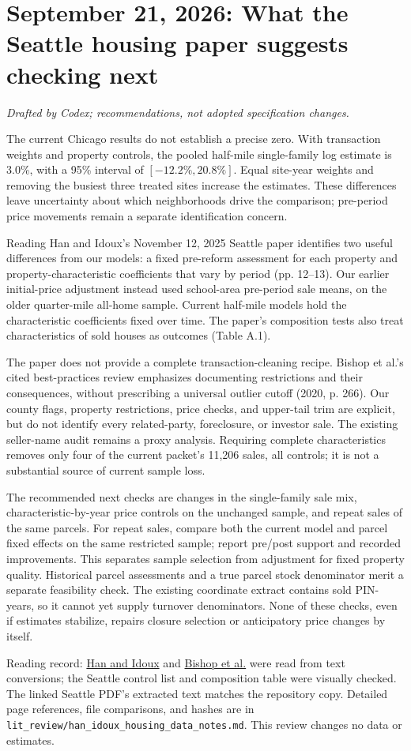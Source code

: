 \section*{September 21, 2026: What the Seattle housing paper suggests checking next}
\textit{Drafted by Codex; recommendations, not adopted specification changes.}

The current Chicago results do not establish a precise zero. With transaction
weights and property controls, the pooled half-mile single-family log estimate
is 3.0\%, with a 95\% interval of $[-12.2\%,20.8\%]$. Equal site-year weights
and removing the busiest three treated sites increase the estimates. These
differences leave uncertainty about which neighborhoods drive the comparison;
pre-period price movements remain a separate identification concern.

Reading Han and Idoux's November 12, 2025 Seattle paper identifies two useful
differences from our models: a fixed pre-reform assessment for each property
and property-characteristic coefficients that vary by period (pp. 12--13).
Our earlier initial-price adjustment instead used school-area pre-period sale
means, on the older quarter-mile all-home sample. Current half-mile models
hold the characteristic coefficients fixed over time. The paper's composition
tests also treat characteristics of sold houses as outcomes (Table A.1).

The paper does not provide a complete transaction-cleaning recipe. Bishop et
al.'s cited best-practices review emphasizes documenting restrictions and their
consequences, without prescribing a universal outlier cutoff (2020, p. 266).
Our county flags, property restrictions, price checks, and upper-tail trim are
explicit, but do not identify every related-party, foreclosure, or investor
sale. The existing seller-name audit remains a proxy analysis. Requiring
complete characteristics removes only four of the current packet's 11,206
sales, all controls; it is not a substantial source of current sample loss.

The recommended next checks are changes in the single-family sale mix,
characteristic-by-year price controls on the unchanged sample, and repeat sales
of the same parcels. For repeat sales, compare both the current model and
parcel fixed effects on the same restricted sample; report pre/post support
and recorded improvements. This separates sample selection from adjustment
for fixed property quality. Historical parcel assessments and a true parcel
stock denominator merit a separate feasibility check. The existing coordinate
extract contains sold PIN-years, so it cannot yet supply turnover denominators.
None of these checks, even if estimates stabilize, repairs closure selection
or anticipatory price changes by itself.

{\small Reading record: \href{https://raymondwhan.github.io/JMP_Han.pdf}{Han and Idoux}
and \href{https://www.kellycbishop.com/REEP2020.pdf}{Bishop et al.} were read from
text conversions; the Seattle control list and composition table were visually
checked. The linked Seattle PDF's extracted text matches the repository copy.
Detailed page references, file comparisons, and hashes are in
\texttt{lit\_review/han\_idoux\_housing\_data\_notes.md}. This review changes no
data or estimates.}

